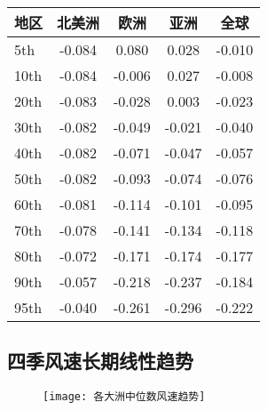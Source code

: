 \begin{table}[!htbp]
    \label{tab:windpercentile}
    \centering
    \small%
    \setlength{\tabcolsep}{15 pt}%
    \renewcommand{\arraystretch}{1.0}%
    \begin{tabular}{lcccc}
        \hline
        地区 & 北美洲 & 欧洲 & 亚洲 & 全球 \\
        \hline
        5th & -0.084 & 0.080 & 0.028 & -0.010 \\
        10th & -0.084 & -0.006 & 0.027 & -0.008 \\
        20th & -0.083 & -0.028 & 0.003 & -0.023 \\
        30th & -0.082 & -0.049 & -0.021 & -0.040 \\
        40th & -0.082 & -0.071 & -0.047 & -0.057 \\
        50th & -0.082 & -0.093 & -0.074 & -0.076 \\
        60th & -0.081 & -0.114 & -0.101 & -0.095 \\
        70th & -0.078 &  -0.141 & -0.134 & -0.118 \\
        80th & -0.072 & -0.171 & -0.174 & -0.177 \\
        90th & -0.057 & -0.218 & -0.237 & -0.184 \\
        95th & -0.040 & -0.261 & -0.296 & -0.222 \\           
        \hline
    \end{tabular}
\end{table}

\subsection{四季风速长期线性趋势}

\begin{figure}[!b]
    \centering
    \texttt{[image: 各大洲中位数风速趋势]}
    \label{fig:regionalmedianwindtrend}
\end{figure}


